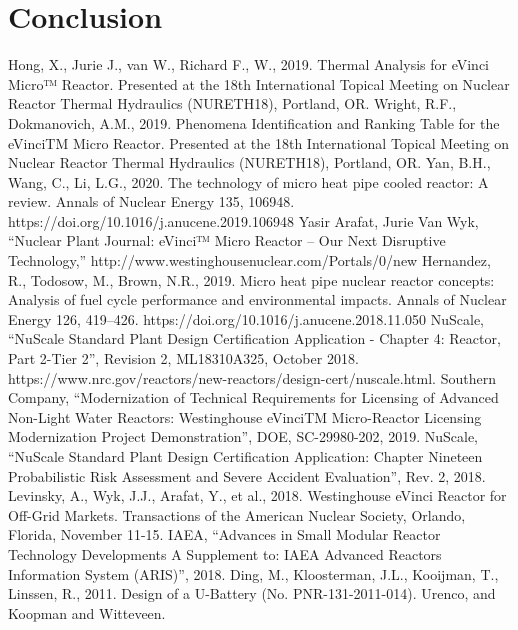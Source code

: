 \documentclass[10pt,a4paper]{article}
\begin{document}
\pagebreak
\section{Conclusion}

\pagebreak
\begin{thebibliography}{X}
 Hong, X., Jurie J.,  van W., Richard F., W., 2019. Thermal Analysis for eVinci Micro™ Reactor. Presented at the 18th International Topical Meeting on Nuclear Reactor Thermal Hydraulics (NURETH18), Portland, OR.
 Wright, R.F., Dokmanovich, A.M., 2019. Phenomena Identification and Ranking Table for the eVinciTM Micro Reactor. Presented at the 18th International Topical Meeting on Nuclear Reactor Thermal Hydraulics (NURETH18), Portland, OR.
 Yan, B.H., Wang, C., Li, L.G., 2020. The technology of micro heat pipe cooled reactor: A review. Annals of Nuclear Energy 135, 106948. https://doi.org/10.1016/j.anucene.2019.106948
 Yasir Arafat, Jurie Van Wyk, “Nuclear Plant Journal: eVinci™ Micro Reactor – Our Next Disruptive Technology,” http://www.westinghousenuclear.com/Portals/0/new%
 Hernandez, R., Todosow, M., Brown, N.R., 2019. Micro heat pipe nuclear reactor concepts: Analysis of fuel cycle performance and environmental impacts. Annals of Nuclear Energy 126, 419–426. https://doi.org/10.1016/j.anucene.2018.11.050
 NuScale, “NuScale Standard Plant Design Certification Application - Chapter 4: Reactor, Part 2-Tier 2”, Revision 2, ML18310A325, October 2018. https://www.nrc.gov/reactors/new-reactors/design-cert/nuscale.html. 
 Southern Company, “Modernization of Technical Requirements for Licensing of Advanced Non-Light Water Reactors: Westinghouse eVinciTM Micro-Reactor Licensing Modernization Project Demonstration”, DOE, SC-29980-202, 2019.
 NuScale, “NuScale Standard Plant Design Certification Application: Chapter Nineteen Probabilistic Risk Assessment and Severe Accident Evaluation”, Rev. 2, 2018. 
 Levinsky, A., Wyk, J.J., Arafat, Y., et al., 2018. Westinghouse eVinci Reactor for Off-Grid Markets. Transactions of the American Nuclear Society, Orlando, Florida, November 11-15.
 IAEA, “Advances in Small Modular Reactor Technology Developments A Supplement to: IAEA Advanced Reactors Information System (ARIS)”, 2018. 
Ding, M., Kloosterman, J.L., Kooijman, T., Linssen, R., 2011. Design of a U-Battery (No. PNR-131-2011-014). Urenco, and Koopman and Witteveen.

\end{thebibliography}
\end{document}

